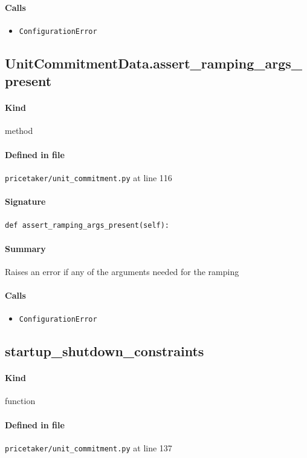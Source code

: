 \documentclass[11pt]{report}
\begin{document}
\paragraph{Calls}
\begin{itemize}[leftmargin=*]
  \item \texttt{ConfigurationError}
\end{itemize}
\subsection{UnitCommitmentData.assert\_ramping\_args\_present}
\label{def:pricetaker-unit_commitment.py:UnitCommitmentData.assert_ramping_args_present:L116}
\paragraph{Kind} method
\paragraph{Defined in file} \texttt{pricetaker/unit\_commitment.py} at line 116
\paragraph{Signature} \texttt{def assert\_ramping\_args\_present(self):}
\paragraph{Summary} Raises an error if any of the arguments needed for the ramping
\paragraph{Calls}
\begin{itemize}[leftmargin=*]
  \item \texttt{ConfigurationError}
\end{itemize}
\subsection{startup\_shutdown\_constraints}
\label{def:pricetaker-unit_commitment.py:startup_shutdown_constraints:L137}
\paragraph{Kind} function
\paragraph{Defined in file} \texttt{pricetaker/unit\_commitment.py} at line 137
\end{document}

